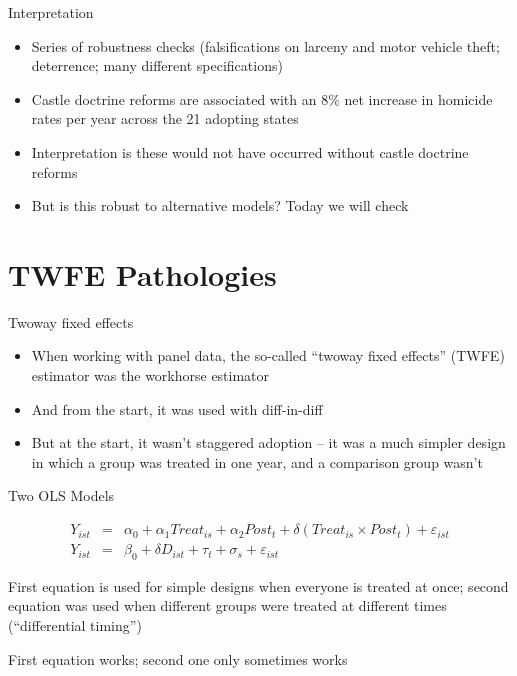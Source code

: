 \documentclass{beamer}
\begin{document}
\begin{frame}{Interpretation}
	
	\begin{itemize}
	\item Series of robustness checks (falsifications on larceny and motor vehicle theft; deterrence; many different specifications)
	\item Castle doctrine reforms are associated with an 8\% net increase in homicide rates per year across the 21 adopting states
	\item Interpretation is these would not have occurred without castle doctrine reforms
	\item But is this robust to alternative models? Today we will check
	\end{itemize}
\end{frame}






\section{TWFE Pathologies}

\begin{frame}{Twoway fixed effects}

\begin{itemize}
\item When working with panel data, the so-called ``twoway fixed effects'' (TWFE) estimator was the workhorse estimator
\item And from the start, it was used with diff-in-diff
\item But at the start, it wasn't staggered adoption -- it was a much simpler design in which a group was treated in one year, and a comparison group wasn't
\end{itemize}

\end{frame}

\begin{frame}{Two OLS Models}

\begin{eqnarray}
Y_{ist} &=& \alpha_0 + \alpha_1 Treat_{is} + \alpha_2 Post_{t} + \delta (Treat_{is} \times Post_t) + \varepsilon_{ist} \\
Y_{ist} &=& \beta_0 + \delta D_{ist} + \tau_t + \sigma_s + \varepsilon_{ist}
\end{eqnarray}

\bigskip

First equation is used for simple designs when everyone is treated at once; second equation was used when different groups were treated at different times (``differential timing'')

\bigskip

First equation works; second one only sometimes works

\end{frame}
\end{document}
